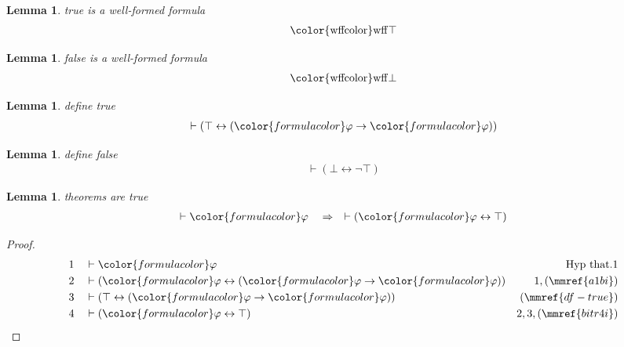 \documentclass{article}
\theoremstyle{plain}
\newtheorem{lemma}{Theorem}[section]
\newtheorem{lemma}[theorem]{Lemma}
\begin{document}
\begin{lemma} true is a well-formed formula
\begin{align}
{\rm\color{wffcolor} wff} \top\label{wtrue}
\end{align}
\end{lemma}

\begin{lemma} false is a well-formed formula
\begin{align}
{\rm\color{wffcolor} wff} \bot\label{wfalse}
\end{align}
\end{lemma}

\begin{lemma} define true
\begin{align}
\vdash ( \top \leftrightarrow ( {\color{formulacolor}\varphi} \rightarrow
    {\color{formulacolor}\varphi} ) )\label{df-true}
\end{align}
\end{lemma}

\begin{lemma} define false
\begin{align}
\vdash ( \bot \leftrightarrow \lnot \top )\label{df-false}
\end{align}
\end{lemma}

\begin{lemma} theorems are true
\begin{align}
\vdash {\color{formulacolor}\varphi}\quad\Rightarrow\quad \vdash (
    {\color{formulacolor}\varphi} \leftrightarrow \top )\label{bl.that}
\end{align}
\end{lemma}

\begin{proof}
\begin{align}
  1 && & \vdash {\color{formulacolor}\varphi}&\text{Hyp~that.1}\notag%
  \\ 2 && & \vdash ( {\color{formulacolor}\varphi} \leftrightarrow (
      {\color{formulacolor}\varphi} \rightarrow
      {\color{formulacolor}\varphi} )
      )&1,(\mmref{a1bi})\notag
  \\ 3 && & \vdash ( \top \leftrightarrow ( {\color{formulacolor}\varphi}
      \rightarrow {\color{formulacolor}\varphi} )
      )&(\mmref{df-true})\notag
  \\ 4 && & \vdash ( {\color{formulacolor}\varphi} \leftrightarrow \top
      )&2,3,(\mmref{bitr4i})\notag
\end{align}
\end{proof}
\end{document}
